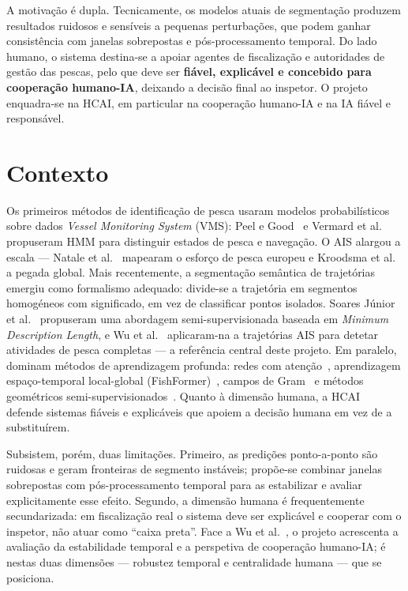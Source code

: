 \documentclass{article}
\begin{document}
A motivação é dupla. Tecnicamente, os modelos atuais de segmentação produzem resultados ruidosos e sensíveis a pequenas perturbações, que podem ganhar consistência com janelas sobrepostas e pós-processamento temporal. Do lado humano, o sistema destina-se a apoiar agentes de fiscalização e autoridades de gestão das pescas, pelo que deve ser \textbf{fiável, explicável e concebido para cooperação humano-IA}, deixando a decisão final ao inspetor. O projeto enquadra-se na HCAI, em particular na cooperação humano-IA e na IA fiável e responsável.

\section{Contexto}
\label{sec:contexto}

Os primeiros métodos de identificação de pesca usaram modelos probabilísticos sobre dados \emph{Vessel Monitoring System} (VMS): Peel e Good~ e Vermard et al.~ propuseram HMM para distinguir estados de pesca e navegação. O AIS alargou a escala --- Natale et al.~ mapearam o esforço de pesca europeu e Kroodsma et al.~ a pegada global. Mais recentemente, a segmentação semântica de trajetórias emergiu como formalismo adequado: divide-se a trajetória em segmentos homogéneos com significado, em vez de classificar pontos isolados. Soares Júnior et al.~ propuseram uma abordagem semi-supervisionada baseada em \emph{Minimum Description Length}, e Wu et al.~ aplicaram-na a trajetórias AIS para detetar atividades de pesca completas --- a referência central deste projeto. Em paralelo, dominam métodos de aprendizagem profunda: redes com atenção~\cite{cheng2025}, aprendizagem espaço-temporal local-global (FishFormer)~\cite{wang2026}, campos de Gram~\cite{hu2026} e métodos geométricos semi-supervisionados~\cite{ferreira2022}. Quanto à dimensão humana, a HCAI~\cite{shneiderman2020} defende sistemas fiáveis e explicáveis que apoiem a decisão humana em vez de a substituírem.

Subsistem, porém, duas limitações. Primeiro, as predições ponto-a-ponto são ruidosas e geram fronteiras de segmento instáveis; propõe-se combinar janelas sobrepostas com pós-processamento temporal para as estabilizar e avaliar explicitamente esse efeito. Segundo, a dimensão humana é frequentemente secundarizada: em fiscalização real o sistema deve ser explicável e cooperar com o inspetor, não atuar como ``caixa preta''. Face a Wu et al.~, o projeto acrescenta a avaliação da estabilidade temporal e a perspetiva de cooperação humano-IA; é nestas duas dimensões --- robustez temporal e centralidade humana --- que se posiciona.
\end{document}

